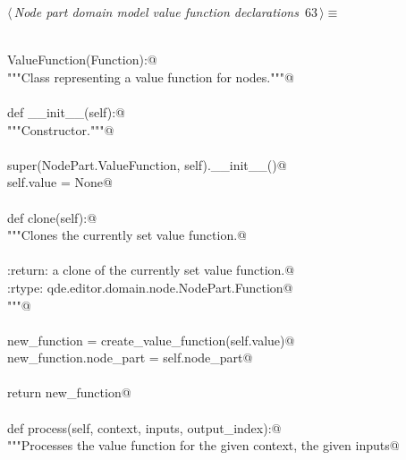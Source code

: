 \documentclass[
    a4paper,      %
    10pt,         %
    openright,    %
    notitlepage,  %
    parskip=half, %
]{scrreprt}       %
\theoremstyle{definition}                    %
\begin{document}
\begin{flushleft} \small
\begin{minipage}{\linewidth}\label{scrap104}\raggedright\small
{} $\langle\,${\itshape Node part domain model value function declarations}\nobreak\ {\footnotesize {63}}$\,\rangle\equiv$
\vspace{-1exm}
\begin{list}{}{} \item
\mbox{}\lstinline@@\\
\mbox{}\lstinline@class ValueFunction(Function):@\\
\mbox{}\lstinline@    """Class representing a value function for nodes."""@\\
\mbox{}\lstinline@@\\
\mbox{}\lstinline@    def __init__(self):@\\
\mbox{}\lstinline@        """Constructor."""@\\
\mbox{}\lstinline@@\\
\mbox{}\lstinline@        super(NodePart.ValueFunction, self).__init__()@\\
\mbox{}\lstinline@        self.value = None@\\
\mbox{}\lstinline@@\\
\mbox{}\lstinline@    def clone(self):@\\
\mbox{}\lstinline@        """Clones the currently set value function.@\\
\mbox{}\lstinline@@\\
\mbox{}\lstinline@        :return: a clone of the currently set value function.@\\
\mbox{}\lstinline@        :rtype: qde.editor.domain.node.NodePart.Function@\\
\mbox{}\lstinline@        """@\\
\mbox{}\lstinline@@\\
\mbox{}\lstinline@        new_function = create_value_function(self.value)@\\
\mbox{}\lstinline@        new_function.node_part = self.node_part@\\
\mbox{}\lstinline@@\\
\mbox{}\lstinline@        return new_function@\\
\mbox{}\lstinline@@\\
\mbox{}\lstinline@    def process(self, context, inputs, output_index):@\\
\mbox{}\lstinline@        """Processes the value function for the given context, the given inputs@\\

\end{list}
\end{minipage}
\end{flushleft}
\end{document}

